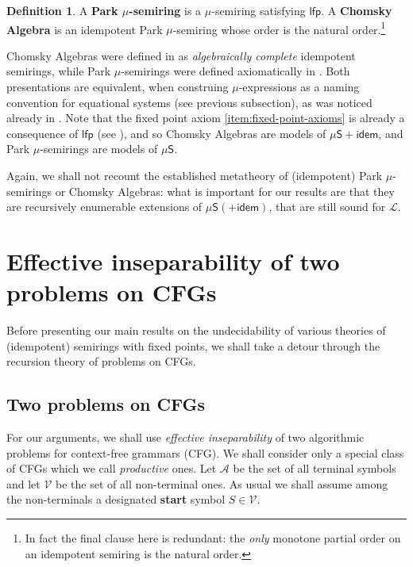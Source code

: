 \documentclass[a4paper,10pt]{amsart}
\newcommand{\defname}[1]{\textbf{{#1}}}
\theoremstyle{definition}
\newtheorem{definition}[theorem]{Definition}
\newcommand{\Alphabet}{\mathcal{A}}
\newcommand{\Var}{\mathcal{V}}
\newcommand{\Lang}{\mathcal L}
\newcommand{\basicax}{\mu\mathsf{S}}
\newcommand{\idem}{\mathsf{idem}}
\newcommand{\ind}{\mathsf{lfp}}
\begin{document}
\begin{definition}
        A \defname{Park $\mu$-semiring} is a $\mu$-semiring satisfying $\ind$. A \defname{Chomsky Algebra} is an idempotent Park $\mu$-semiring whose order is the natural order.\footnote{In fact the final clause here is redundant: the \emph{only} monotone partial order on an idempotent semiring is the natural order.}
\end{definition}

Chomsky Algebras were defined in \cite{GHK13,Leiss16} as \emph{algebraically complete} idempotent semirings, while Park $\mu$-semirings were defined axiomatically in \cite{EsikLeiss02,EsikLeiss05}. 
Both presentations are equivalent, when construing $\mu$-expressions as a naming convention for equational systems (see previous subsection), as was noticed already in \cite{GHK13}.
Note that the fixed point axiom \eqref{item:fixed-point-axioms} is already a consequence of $\ind$ (see \cite{EsikLeiss02,EsikLeiss05}), and so Chomsky Algebras are models of $\basicax+\idem$, and Park $\mu$-semirings are models of $\basicax$.



Again, we shall not recount the established metatheory of (idempotent) Park $\mu$-semirings or Chomsky Algebras: what is important for our results are that they are recursively enumerable extensions of $\basicax (+ \idem)$, that are still sound for $\Lang$.

% 


\section{Effective inseparability of two problems on CFGs}
\label{sec:eff-insep}

Before presenting our main results on the undecidability of various theories of (idempotent) semirings with fixed points, we shall take a detour through the recursion theory of problems on CFGs.

\subsection{Two problems on CFGs}

For our arguments, we shall use {\em effective inseparability} of two algorithmic problems for context-free grammars (CFG). 
We shall consider only a special class of CFGs which we call \emph{productive} ones. Let $\Alphabet$ be the set of all terminal symbols and let $\Var$ be the set of all non-terminal ones.
As usual we shall assume among the non-terminals a designated \textbf{start} symbol $S \in \Var$.
\end{document}
